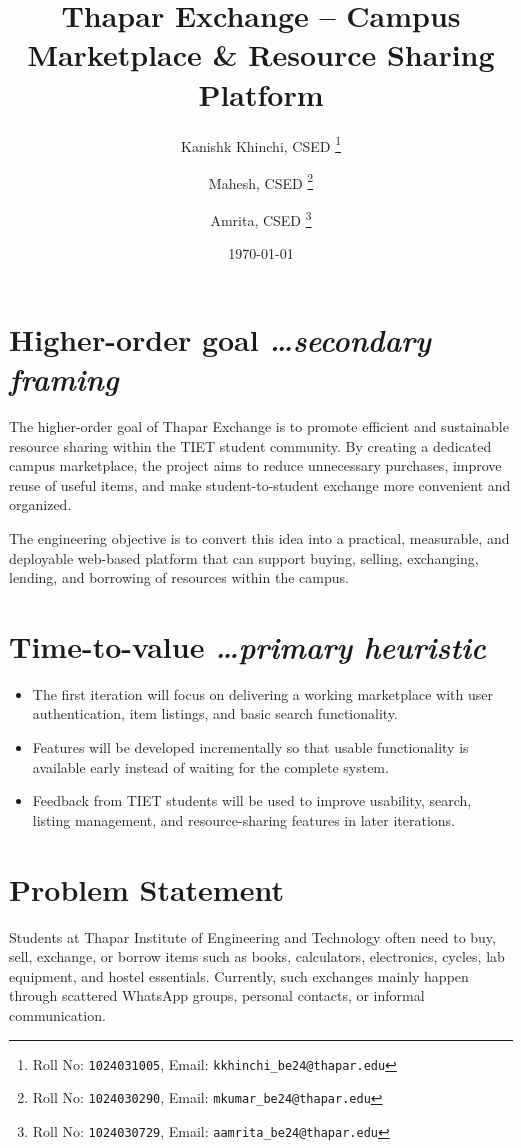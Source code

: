 \documentclass[11pt,a4paper]{article}
\title{Thapar Exchange -- Campus Marketplace \& Resource Sharing Platform}
\author{
  Kanishk Khinchi, CSED%
  \thanks{Roll No: \texttt{1024031005}, %
    Email: \texttt{kkhinchi\_be24@thapar.edu}}
  \and
  Mahesh, CSED%
  \thanks{Roll No: \texttt{1024030290}, %
    Email: \texttt{mkumar\_be24@thapar.edu}}
  \and
  Amrita, CSED%
  \thanks{Roll No: \texttt{1024030729}, %
    Email: \texttt{aamrita\_be24@thapar.edu}}
}
\date{\today}
\newcommand{\BvrHint}[1]{%
  {\normalfont\normalsize\itshape\hfill #1}}
\begin{document}
\maketitle

\section{Higher-order goal %
  \BvrHint{\ldots secondary framing}}

The higher-order goal of Thapar Exchange is to promote efficient and sustainable resource sharing within the TIET student community. By creating a dedicated campus marketplace, the project aims to reduce unnecessary purchases, improve reuse of useful items, and make student-to-student exchange more convenient and organized.

The engineering objective is to convert this idea into a practical, measurable, and deployable web-based platform that can support buying, selling, exchanging, lending, and borrowing of resources within the campus.

\section{Time-to-value %
\BvrHint{\ldots primary heuristic}}

\begin{itemize}[leftmargin=0.7cm]
    \item The first iteration will focus on delivering a working marketplace with user authentication, item listings, and basic search functionality.
    \item Features will be developed incrementally so that usable functionality is available early instead of waiting for the complete system.
    \item Feedback from TIET students will be used to improve usability, search, listing management, and resource-sharing features in later iterations.
\end{itemize}

\section{Problem Statement}
Students at Thapar Institute of Engineering and Technology often need to buy, sell, exchange, or borrow items such as books, calculators, electronics, cycles, lab equipment, and hostel essentials. Currently, such exchanges mainly happen through scattered WhatsApp groups, personal contacts, or informal communication.
\end{document}
